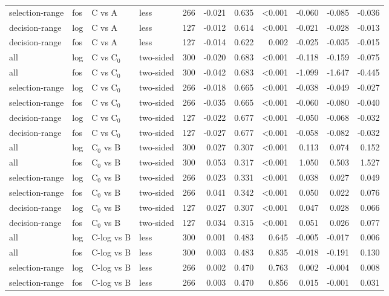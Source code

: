 \begin{longtable}{llllrrrrrrr}
selection-range & fos & C vs A & less & 266 & -0.021 & 0.635 & <0.001 & -0.060 & -0.085 & -0.036 \\
decision-range & log & C vs A & less & 127 & -0.012 & 0.614 & <0.001 & -0.021 & -0.028 & -0.013 \\
decision-range & fos & C vs A & less & 127 & -0.014 & 0.622 & 0.002 & -0.025 & -0.035 & -0.015 \\
all & log & C vs C$_0$ & two-sided & 300 & -0.020 & 0.683 & <0.001 & -0.118 & -0.159 & -0.075 \\
all & fos & C vs C$_0$ & two-sided & 300 & -0.042 & 0.683 & <0.001 & -1.099 & -1.647 & -0.445 \\
selection-range & log & C vs C$_0$ & two-sided & 266 & -0.018 & 0.665 & <0.001 & -0.038 & -0.049 & -0.027 \\
selection-range & fos & C vs C$_0$ & two-sided & 266 & -0.035 & 0.665 & <0.001 & -0.060 & -0.080 & -0.040 \\
decision-range & log & C vs C$_0$ & two-sided & 127 & -0.022 & 0.677 & <0.001 & -0.050 & -0.068 & -0.032 \\
decision-range & fos & C vs C$_0$ & two-sided & 127 & -0.027 & 0.677 & <0.001 & -0.058 & -0.082 & -0.032 \\
all & log & C$_0$ vs B & two-sided & 300 & 0.027 & 0.307 & <0.001 & 0.113 & 0.074 & 0.152 \\
all & fos & C$_0$ vs B & two-sided & 300 & 0.053 & 0.317 & <0.001 & 1.050 & 0.503 & 1.527 \\
selection-range & log & C$_0$ vs B & two-sided & 266 & 0.023 & 0.331 & <0.001 & 0.038 & 0.027 & 0.049 \\
selection-range & fos & C$_0$ vs B & two-sided & 266 & 0.041 & 0.342 & <0.001 & 0.050 & 0.022 & 0.076 \\
decision-range & log & C$_0$ vs B & two-sided & 127 & 0.027 & 0.307 & <0.001 & 0.047 & 0.028 & 0.066 \\
decision-range & fos & C$_0$ vs B & two-sided & 127 & 0.034 & 0.315 & <0.001 & 0.051 & 0.026 & 0.077 \\
all & log & C-log vs B & less & 300 & 0.001 & 0.483 & 0.645 & -0.005 & -0.017 & 0.006 \\
all & fos & C-log vs B & less & 300 & 0.003 & 0.483 & 0.835 & -0.018 & -0.191 & 0.130 \\
selection-range & log & C-log vs B & less & 266 & 0.002 & 0.470 & 0.763 & 0.002 & -0.004 & 0.008 \\
selection-range & fos & C-log vs B & less & 266 & 0.003 & 0.470 & 0.856 & 0.015 & -0.001 & 0.031 \\

\end{longtable}
